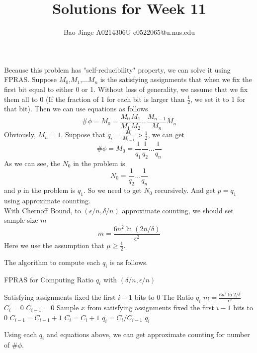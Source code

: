 \documentclass{article}
\author{Bao Jinge A0214306U e0522065@u.nus.edu}
\title{Solutions for Week 11}
\date{}
\begin{document}
	\maketitle
	\section{}

	\subsection{}
	Because this problem has "self-reducibility" property, we can solve it using FPRAS. Suppose $M_0$,$M_1$,...$M_n$ is the satisfying assignments that when we fix the first bit equal to either 0 or 1. Without loss of generality, we assume that we fix them all to 0 (If the fraction of 1 for each bit is larger than $\frac{1}{2}$, we set it to 1 for that bit). Then we can use equations as follows
	$$
	\#\phi = M_0 = \frac{M_0}{M_1}\frac{M_1}{M_2}...\frac{M_{n-1}}{M_n}M_n
	$$
	Obviously, $M_n=1$. Suppose that $q_i=\frac{M_i}{M_{i-1}} > \frac{1}{2}$, we can get
	$$
	\#\phi = M_0 = \frac{1}{q_1}\frac{1}{q_2}...\frac{1}{q_n}
	$$
	As we can see, the $N_0$ in the problem is
	$$
	N_0 = \frac{1}{q_2}...\frac{1}{q_n}
	$$
	and $p$ in the problem is $q_1$.
	So we need to get $N_0$ recursively. And get $p=q_1$ using approximate counting.\\
	With Chernoff Bound, to $(\epsilon / n, \delta / n)$ approximate counting, we should set sample size $m$
	$$
	m = \frac{6n^2\ln{(2n/\delta)}}{\epsilon^2}
	$$
	Here we use the assumption that $\mu \geq \frac{1}{2}$.

	The algorithm to compute each $q_i$ is as follows.

	\begin{algorithm}
	\caption{FPRAS for Computing Ratio $q_i$ with $(\delta /n,\epsilon /n)$}
	\label{alg:A}
	\begin{algorithmic}
	\REQUIRE Satisfying assignments fixed the first $i-1$ bits to $0$
	\ENSURE The Ratio $q_i$
	\STATE $m = \frac{6n^2\ln{2/\delta}}{\epsilon^2}$
	\STATE $C_i = 0$
	\STATE $C_{i-1} =0$
	\STATE Sample $x$ from satisfying assignments fixed the first $i-1$ bits to $0$
		\STATE $C_{i-1} = C_{i-1} + 1$
		\STATE $C_{i} = C_{i} + 1$
		\ENDIF 
	\ENDFOR
	\STATE $q_i = C_{i}/C_{i-1}$
	\RETURN $q_i$
	\end{algorithmic}
	\end{algorithm}
	Using each $q_i$ and equations above, we can get approximate counting for number of $\#\phi$.
\end{document}
